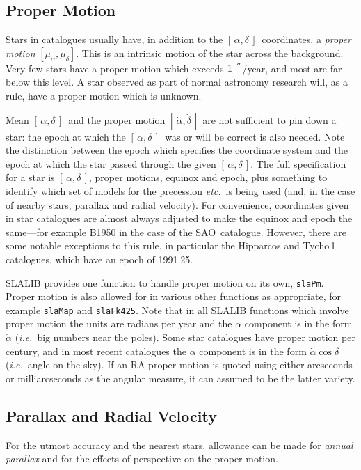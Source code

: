 \documentclass[11pt,fleqn,twoside]{article}
\renewcommand{\_}{{\tt\char'137}}     %
\newcommand{\radec}     {$[\,\alpha,\delta\,]$}
\newcommand{\arcseci}[1] {$#1\hspace{0.05em}$\raisebox{-0.5ex}
                         {$^{'\hspace{-0.1em}'\hspace{0.0em}}$}}
\begin{document}
\subsection{Proper Motion}
Stars in catalogues usually have, in addition to the
\radec\  coordinates, a {\it proper motion} $[\mu_\alpha,\mu_\delta]$.
This is an intrinsic motion
of the star across the background.  Very few stars have a
proper motion which exceeds \arcseci{1}/year, and most are
far below this level.  A star observed as part of normal
astronomy research will, as a rule, have a proper motion
which is unknown.
 
Mean \radec\ and the proper motion $[\,\dot{\alpha},\dot{\delta}\,]$
are not sufficient to pin
down a star: the epoch at which the \radec\ was or will
be correct is also needed.  Note the distinction
between the epoch which specifies the
coordinate system and the epoch at which the star passed
through the given \radec.  The full specification for a star
is \radec, proper motions, equinox and epoch, plus something to
identify which set of models for the precession {\it etc.}\ is
being used (and, in the case of nearby stars, parallax and
radial velocity).
For convenience, coordinates given in star catalogues are almost
always adjusted to make the equinox and epoch the same---for
example B1950 in the case of the SAO~catalogue.  However, there
are some notable exceptions to this rule, in particular the
Hipparcos and Tycho\,1 catalogues, which have an epoch of
1991.25.

SLALIB provides one function to handle proper motion on its own,
{\tt slaPm}.
Proper motion is also allowed for in various other
functions as appropriate, for example
{\tt slaMap}
and
{\tt slaFk425}.
Note that in all SLALIB functions which involve proper motion
the units are radians per year and the
$\alpha$ component is in the form $\dot{\alpha}$ ({\it i.e.}~big
numbers near the poles).
Some star catalogues have proper motion per century, and
in most recent catalogues the $\alpha$ component is in the form
$\dot{\alpha}\cos\delta$ ({\it i.e.}~angle on the sky).  If
an RA proper motion is quoted using either arcseconds or milliarcseconds
as the angular measure, it can assumed to be the latter variety.

\subsection{Parallax and Radial Velocity}
For the utmost accuracy and the nearest stars, allowance can
be made for {\it annual parallax}\/ and for the effects of perspective
on the proper motion.
 
\end{document}
